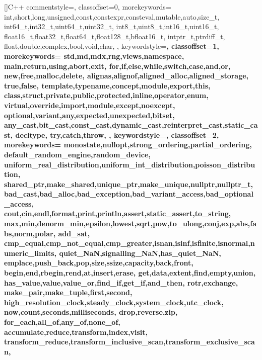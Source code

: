\newcommand\lstcpp{cpp}
[]{C++}{
  commentstyle=\rmfamily\color{gray},
  classoffset=0,
  morekeywords={
    int,short,long,unsigned,const,constexpr,consteval,mutable,auto,size_t,
    int64_t,int32_t,uint64_t,uint32_t,
    int8_t,uint8_t,int16_t,uint16_t,
    float16_t,float32_t,float64_t,float128_t,bfloat16_t,
    intptr_t,ptrdiff_t,
    float,double,complex,bool,void,char,
  },
  keywordstyle=\bfseries\color{indianred},
  classoffset=1,
  morekeywords={
    std,md,mdx,rng,views,namespace,
    main,return,using,abort,exit,
    for,if,else,while,switch,case,and,or,
    new,free,malloc,delete,
    alignas,alignof,aligned_alloc,aligned_storage,
    true,false,
    template,typename,concept,module,export,this,
    class,struct,private,public,protected,inline,operator,enum,
    virtual,override,import,module,except,noexcept,
    optional,variant,any,expected,unexpected,bitset,
    any_cast,bit_cast,const_cast,dynamic_cast,reinterpret_cast,static_cast,
    decltype,
    try,catch,throw,
  },
  keywordstyle=\bfseries\color{airforceblue}, %
  classoffset=2,
  morekeywords={
    monostate,nullopt,strong_ordering,partial_ordering,
    default_random_engine,random_device,
    uniform_real_distribution,uniform_int_distribution,poisson_distribution,
    shared_ptr,make_shared,unique_ptr,make_unique,nullptr,nullptr_t,
    bad_cast,bad_alloc,bad_exception,bad_variant_access,bad_optional_access,
    cout,cin,endl,format,print,println,assert,static_assert,to_string,
    max,min,denorm_min,epsilon,lowest,sqrt,pow,to_ulong,conj,exp,abs,fabs,norm,polar,
    add_sat,
    cmp_equal,cmp_not_equal,cmp_greater,isnan,isinf,isfinite,isnormal,numeric_limits,
    quiet_NaN,signalling_NaN,has_quiet_NaN,
    emplace,push_back,pop,size,ssize,capacity,back,front,
    begin,end,rbegin,rend,at,insert,erase,
    get,data,extent,find,empty,union,
    has_value,value,value_or,find_if,get_if,and_then,
    rotr,exchange,
    make_pair,make_tuple,first,second,
    high_resolution_clock,steady_clock,system_clock,utc_clock,
    now,count,seconds,milliseconds,
    drop,reverse,zip,
    for_each,all_of,any_of,none_of,
    accumulate,reduce,transform,index,visit,
    transform_reduce,transform_inclusive_scan,transform_exclusive_scan,
}}
